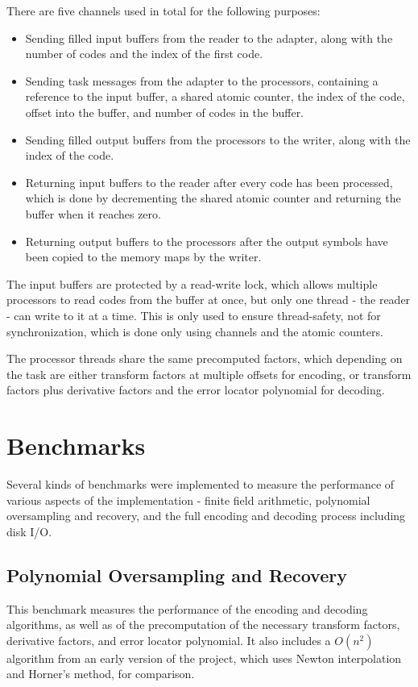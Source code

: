 There are five channels used in total for the following purposes:
\begin{itemize}
    \item Sending filled input buffers from the reader to the adapter, along with the number of codes and the index of the first code.
    \item Sending task messages from the adapter to the processors, containing a reference to the input buffer, a shared atomic counter, the index of the code, offset into the buffer, and number of codes in the buffer.
    \item Sending filled output buffers from the processors to the writer, along with the index of the code.
    \item Returning input buffers to the reader after every code has been processed, which is done by decrementing the shared atomic counter and returning the buffer when it reaches zero.
    \item Returning output buffers to the processors after the output symbols have been copied to the memory maps by the writer.
\end{itemize}

The input buffers are protected by a read-write lock, which allows multiple processors to read codes from the buffer at once, but only one thread - the reader - can write to it at a time.
This is only used to ensure thread-safety, not for synchronization, which is done only using channels and the atomic counters.

The processor threads share the same precomputed factors, which depending on the task are either transform factors at multiple offsets for encoding, or transform factors plus derivative factors and the error locator polynomial for decoding.

\section{Benchmarks}

Several kinds of benchmarks were implemented to measure the performance of various aspects of the implementation - finite field arithmetic, polynomial oversampling and recovery, and the full encoding and decoding process including disk I/O.

\subsection{Polynomial Oversampling and Recovery}

This benchmark measures the performance of the encoding and decoding algorithms, as well as of the precomputation of the necessary transform factors, derivative factors, and error locator polynomial.
It also includes a $O(n^2)$ algorithm from an early version of the project, which uses Newton interpolation and Horner's method, for comparison.

